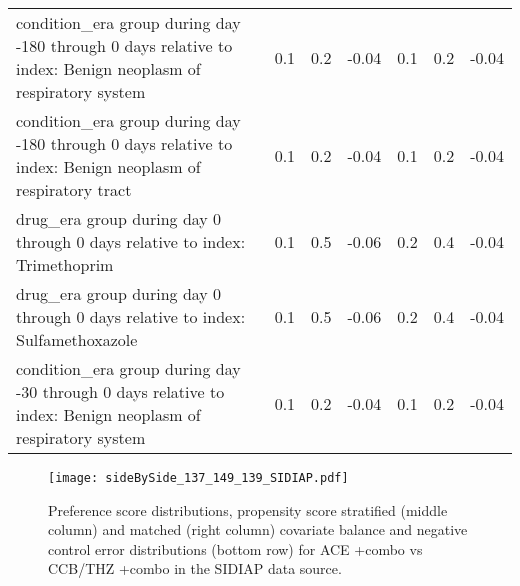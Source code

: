 \documentclass[11pt,]{article}
\begin{document}
\begin{longtable}{p{30em}rrrrrr}
  condition\_era group during day -180 through 0 days relative to index: Benign neoplasm of respiratory system & 0.1 & 0.2 & -0.04 & 0.1 & 0.2 & -0.04 \\ 
  condition\_era group during day -180 through 0 days relative to index: Benign neoplasm of respiratory tract & 0.1 & 0.2 & -0.04 & 0.1 & 0.2 & -0.04 \\ 
  drug\_era group during day 0 through 0 days relative to index: Trimethoprim & 0.1 & 0.5 & -0.06 & 0.2 & 0.4 & -0.04 \\ 
  drug\_era group during day 0 through 0 days relative to index: Sulfamethoxazole & 0.1 & 0.5 & -0.06 & 0.2 & 0.4 & -0.04 \\ 
  condition\_era group during day -30 through 0 days relative to index: Benign neoplasm of respiratory system & 0.1 & 0.2 & -0.04 & 0.1 & 0.2 & -0.04 \\ 
  \bottomrule
\end{longtable}
\clearpage\begin{figure}[H]
    \caption{Preference score distributions,
    propensity score stratified (middle column) and matched (right column) covariate balance
    and negative control error distributions (bottom row) for
    ACE +combo vs CCB/THZ +combo in the SIDIAP data source.}
    \centerline{
        \texttt{[image: sideBySide\_137\_149\_139\_SIDIAP.pdf]}
    }
\end{figure}
\end{document}
